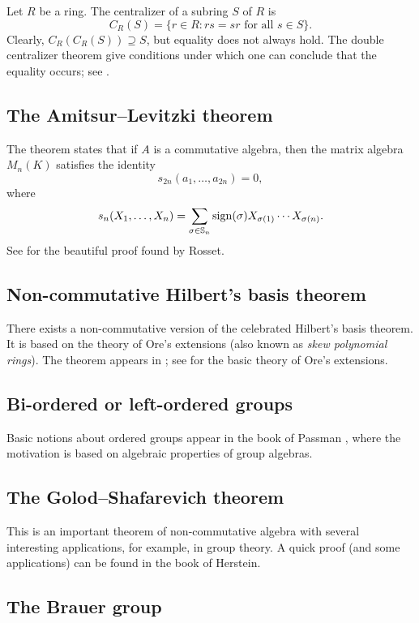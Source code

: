 Let $R$ be a ring. 
The centralizer of a subring $S$ of $R$ 
is 
\[
C_R(S)=\{r\in R: rs=sr\text{ for all $s\in S$}\}.
\]
Clearly, $C_R(C_R(S))\supseteq S$, but equality does not always hold. 
The double centralizer theorem give conditions under which one can conclude that the equality occurs; see \cite[Chapter 4]{MR3308118}. 

\subsection*{The Amitsur--Levitzki theorem}

The theorem states that 
if $A$ is a commutative algebra, then 
the matrix algebra 
$M_n(K)$ satisfies the identity 
\[
s_{2n}(a_{1},\dots ,a_{2n})=0,
\]
where 
\[
s_{n}(X_1,\dots,X_n)=\sum_{\sigma\in\mathbb{S}_n}\operatorname{sign}(\sigma)X_{\sigma(1)}\cdots X_{\sigma(n)}.
\]
See \cite[Theorem 6.39]{MR3308118} for the beautiful 
proof found by Rosset. 

\subsection*{Non-commutative Hilbert's basis theorem}

There exists a non-commutative version of the celebrated
Hilbert's basis theorem. It is based on the theory of Ore's extensions (also known as \emph{skew polynomial rings}). The theorem
appears in \cite[I.8.3]{MR1321145}; see \cite[I.7]{MR1321145} 
for the basic theory of Ore's extensions. 

\subsection*{Bi-ordered or left-ordered groups}

Basic notions about ordered groups appear in the book
of Passman \cite{MR798076}, where the motivation is based on 
algebraic properties of group algebras. 

\subsection*{The Golod--Shafarevich theorem}

This is an important theorem of non-commutative algebra
with several interesting applications, for example, in group theory. 
A quick proof (and some applications) can be found in the book \cite{MR1449137} of Herstein. 

\subsection*{The Brauer group}

